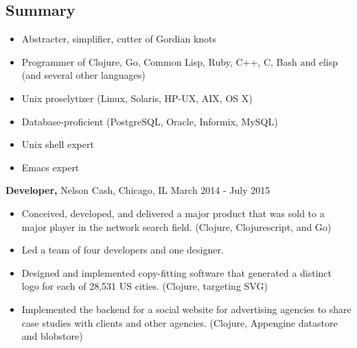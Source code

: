 \documentclass[margin]{res}
\begin{document}
 
 
 
\address{{\bf Home Address} \\ 2446 North Albany Avenue \\ Chicago, IL 60647-2602  \\
        (773) 349-2020 }
\address{{\bf Email Address} \\ me@clojure.us }

 
\begin{resume} 
 
\section{Summary} 
\begin{itemize} \itemsep -2pt %
\item Abstracter, simplifier, cutter of Gordian knots
\item Programmer of Clojure, Go, Common Lisp, Ruby, C++, C, Bash and elisp (and several other languages)
\item Unix proselytizer (Linux, Solaris, HP-UX, AIX, OS X)
\item Database-proficient (PostgreSQL, Oracle, Informix, MySQL)
\item Unix shell expert
\item Emacs expert
\end{itemize}

 {\bf Developer,} Nelson Cash, Chicago, IL \hfill March 2014 - July 2015
\begin{itemize} \itemsep -2pt %
\item Conceived, developed, and delivered a major product that was sold to a major player in the network search field. (Clojure, Clojurescript, and Go)
\item Led a team of four developers and one designer.
\item Designed and implemented copy-fitting software that generated a distinct logo for each of 28,531 US cities. (Clojure, targeting SVG)
\item Implemented the backend for a social website for advertising agencies to share case studies with clients and other agencies.  (Clojure, Appengine datastore and blobstore)
\end{itemize}


\end{resume}
\end{document}
